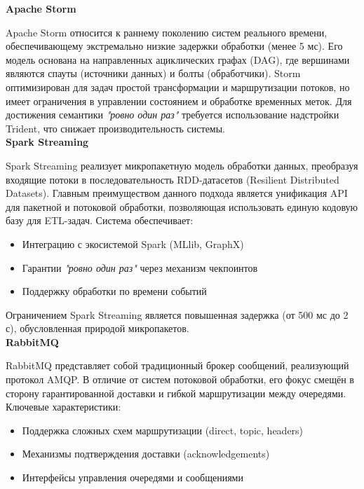             \textbf{Apache Storm}

            Apache Storm относится к раннему поколению систем реального времени, обеспечивающему экстремально низкие задержки обработки (менее 5 мс). Его модель основана на направленных ациклических графах (DAG), где вершинами являются спауты (источники данных) и болты (обработчики). Storm оптимизирован для задач простой трансформации и маршрутизации потоков, но имеет ограничения в управлении состоянием и обработке временных меток. Для достижения семантики \textit{"ровно один раз"} требуется использование надстройки Trident, что снижает производительность системы. \\

            \textbf{Spark Streaming}

            Spark Streaming реализует микропакетную модель обработки данных, преобразуя входящие потоки в последовательность RDD-датасетов (Resilient Distributed Datasets). Главным преимуществом данного подхода является унификация API для пакетной и потоковой обработки, позволяющая использовать единую кодовую базу для ETL-задач. Система обеспечивает:
            \begin{itemize}
                \item Интеграцию с экосистемой Spark (MLlib, GraphX)
                \item Гарантии \textit{"ровно один раз"} через механизм чекпоинтов
                \item Поддержку обработки по времени событий
            \end{itemize}
            
            Ограничением Spark Streaming является повышенная задержка (от 500 мс до 2 с), обусловленная природой микропакетов. \\

            \textbf{RabbitMQ}

            RabbitMQ представляет собой традиционный брокер сообщений, реализующий протокол AMQP. В отличие от систем потоковой обработки, его фокус смещён в сторону гарантированной доставки и гибкой маршрутизации между очередями. Ключевые характеристики:
            \begin{itemize}
                \item Поддержка сложных схем маршрутизации (direct, topic, headers)
                \item Механизмы подтверждения доставки (acknowledgements)
                \item Интерфейсы управления очередями и сообщениями
            \end{itemize}

